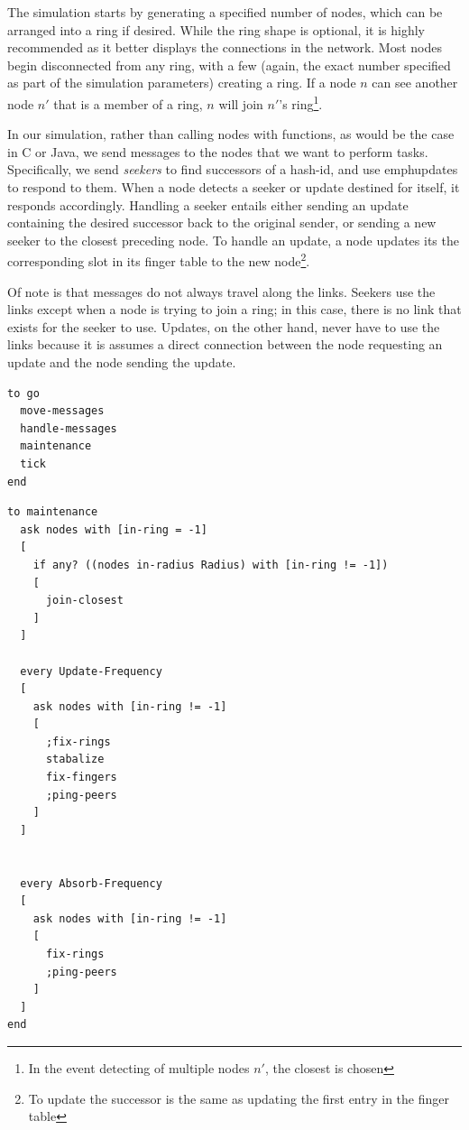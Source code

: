 \documentclass[12pt]{ieeetran} %
\begin{document}
The simulation starts by generating a specified number of nodes, which can be arranged into a ring if desired.  While the ring shape is optional, it is highly recommended as it better displays the connections in the network.  Most nodes begin disconnected from any ring, with a few (again, the exact number specified as part of the simulation parameters) creating a ring.  If a node $n$ can see another node $n'$ that is a member of a ring, $n$ will join  $n'$'s ring\footnote{In the event detecting of multiple nodes $n'$, the closest is chosen}. 

In our simulation, rather than calling nodes with functions, as would be the case in C or Java, we send messages to the nodes that we want to perform tasks. Specifically, we send \emph{seekers} to find successors of a hash-id, and use emph{updates} to respond to them.  When a node detects a seeker or update destined for itself, it responds accordingly.  Handling a seeker entails either sending an update containing the desired successor back to the original sender, or sending a new seeker to the closest preceding node.  To handle an update, a node updates its the corresponding slot in its finger table to the new node\footnote{To update the successor is the same as updating the first entry in the finger table}.


Of note is that messages do not always travel along the links.  Seekers use the links except when a node is trying to join a ring;  in this case, there is no link that exists for the seeker to use. Updates, on the other hand, never have to use the links because it is assumes a direct connection between the node requesting an update and the node sending the update.

\begin{lstlisting}
to go
  move-messages
  handle-messages
  maintenance
  tick
end
\end{lstlisting}



\begin{lstlisting}
to maintenance
  ask nodes with [in-ring = -1] 
  [
    if any? ((nodes in-radius Radius) with [in-ring != -1])
    [
      join-closest
    ]
  ] 
     
  every Update-Frequency
  [
    ask nodes with [in-ring != -1]
    [
      ;fix-rings
      stabalize
      fix-fingers
      ;ping-peers
    ]
  ]
  
  
  every Absorb-Frequency
  [
    ask nodes with [in-ring != -1]
    [
      fix-rings
      ;ping-peers
    ]
  ]
end

\end{lstlisting}
\end{document}

